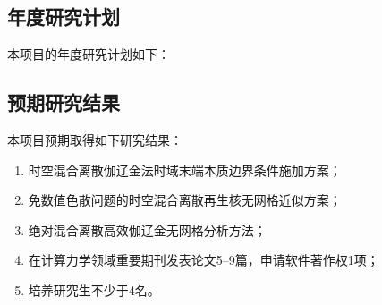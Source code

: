 \subsection{年度研究计划}
本项目的年度研究计划如下：





\subsection{预期研究结果}
本项目预期取得如下研究结果：

\begin{enumerate}[label=（\theenumi）,left=24pt]
    \item 时空混合离散伽辽金法时域末端本质边界条件施加方案；
    \item 免数值色散问题的时空混合离散再生核无网格近似方案；
    \item 绝对混合离散高效伽辽金无网格分析方法；
    \item 在计算力学领域重要期刊发表论文5--9篇，申请软件著作权1项；
    \item 培养研究生不少于4名。
\end{enumerate}
